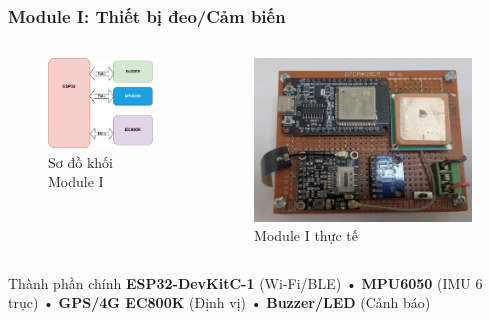 \begin{frame}
\frametitle{Module I: Thiết bị đeo/Cảm biến}

\begin{columns}
\begin{figure}[h]
\centering
\includegraphics[width=\textwidth]{images/module1_block_diagram-crop.pdf}
\caption{Sơ đồ khối Module I}
\end{figure}

\begin{figure}[h]
\centering
\includegraphics[width=\textwidth]{images/real_board1.jpg}
\caption{Module I thực tế}
\end{figure}
\end{columns}

\begin{block}{Thành phần chính}
\textbf{ESP32-DevKitC-1} (Wi-Fi/BLE) • \textbf{MPU6050} (IMU 6 trục) • \textbf{GPS/4G EC800K} (Định vị) • \textbf{Buzzer/LED} (Cảnh báo)
\end{block}

\end{frame}

